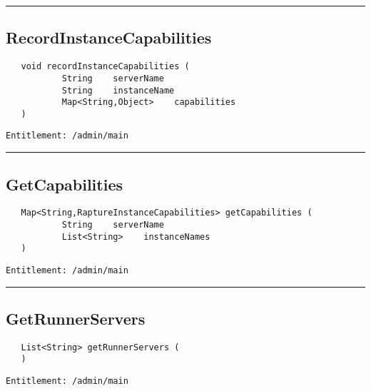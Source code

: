 \rule{12cm}{2pt}
\subsection{RecordInstanceCapabilities}
\label{Api:RecordInstanceCapabilities}
\begin{verbatim}
   void recordInstanceCapabilities (
           String    serverName
           String    instanceName
           Map<String,Object>    capabilities
   )
\end{verbatim}
\begin{Verbatim}[fontsize=\small, formatcom=\color{Maroon}]
  Entitlement: /admin/main
\end{Verbatim}



\rule{12cm}{2pt}
\subsection{GetCapabilities}
\label{Api:GetCapabilities}
\begin{verbatim}
   Map<String,RaptureInstanceCapabilities> getCapabilities (
           String    serverName
           List<String>    instanceNames
   )
\end{verbatim}
\begin{Verbatim}[fontsize=\small, formatcom=\color{Maroon}]
  Entitlement: /admin/main
\end{Verbatim}



\rule{12cm}{2pt}
\subsection{GetRunnerServers}
\label{Api:GetRunnerServers}
\begin{verbatim}
   List<String> getRunnerServers (
   )
\end{verbatim}
\begin{Verbatim}[fontsize=\small, formatcom=\color{Maroon}]
  Entitlement: /admin/main
\end{Verbatim}



